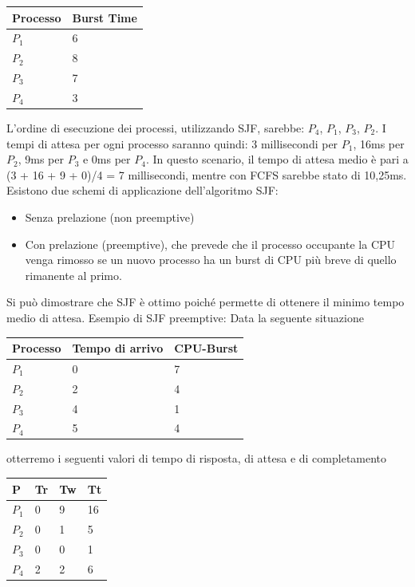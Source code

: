 \documentclass[a4paper]{article}
\begin{document}
\begin{table}[htb]
    \centering
    \label{my-label}
    \begin{tabular}{ll}
        Processo & Burst Time \\ \hline
        $P_1$    & 6          \\
        $P_2$    & 8          \\
        $P_3$    & 7          \\
        $P_4$    & 3
    \end{tabular}
\end{table}

L'ordine di esecuzione dei processi, utilizzando SJF, sarebbe: $P_4$, $P_1$, $P_3$, $P_2$. I tempi di attesa per ogni processo saranno quindi: 3 millisecondi per $P_1$, 16ms per $P_2$, 9ms per $P_3$ e 0ms per $P_4$. In questo scenario, il tempo di attesa medio è pari a (3 + 16 + 9 + 0)/4 = 7 millisecondi, mentre con FCFS sarebbe stato di 10,25ms. \newline
Esistono due schemi di applicazione dell'algoritmo SJF:
\begin{itemize}
\item Senza prelazione (non preemptive)
\item Con prelazione (preemptive), che prevede che il processo occupante la CPU venga rimosso se un nuovo processo ha un burst di CPU più breve di quello rimanente al primo.
\end {itemize}
Si può dimostrare che SJF è ottimo poiché permette di ottenere il minimo tempo medio di attesa.
Esempio di SJF preemptive:\newline
Data la seguente situazione
\begin{table}[htb]
    \centering
    \label{my-label}
    \begin{tabular}{lll}
        Processo & Tempo di arrivo & CPU-Burst \\ \hline
        $P_1$    & 0               & 7         \\
        $P_2$    & 2               & 4         \\
        $P_3$    & 4               & 1         \\
        $P_4$    & 5               & 4
    \end{tabular}
\end{table}

otterremo i seguenti valori di tempo di risposta, di attesa e di completamento

\begin{table}[htb]
    \centering
    \label{my-label}
    \begin{tabular}{llll}
        P     & Tr & Tw & Tt \\ \hline
        $P_1$ & 0  & 9  & 16 \\
        $P_2$ & 0  & 1  & 5  \\
        $P_3$ & 0  & 0  & 1  \\
        $P_4$ & 2  & 2  & 6
    \end{tabular}
\end{table}
\end{document}
